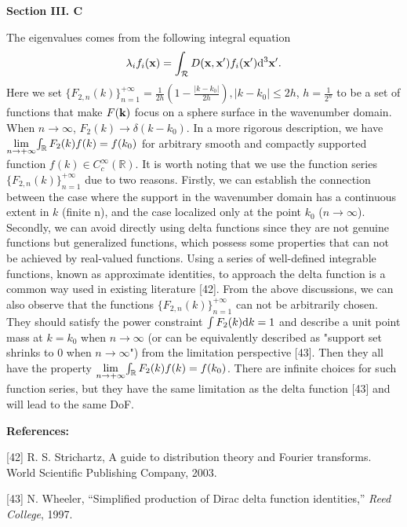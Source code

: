 \documentclass[a4paper,12pt]{article}
\begin{document}
\begin{framed}
	{\bf Section III. C}
	
	\setcounter{equation}{36}

The eigenvalues comes from the following integral equation
\begin{equation}
	\lambda_i f_i({\bf x}) = \int_{\mathcal{R}}D({\bf x},{\bf x}')f_i({\bf x}'){\rm d}^3{\bf x}'.
	\label{eigenfunction_3d}
\end{equation}
Here we set $\{F_{2,n}(k)\}_{n=1}^{+\infty} = \frac{1}{2h}\left( 1-\frac{|k-k_0|}{2h} \right), |k-k_0|\leqslant 2h$, $h = \frac{1}{2^n}$ to be a set of functions that make $F({\bf k})$ focus on a sphere surface in the wavenumber domain. When $n \rightarrow \infty$, $F_2(k) \rightarrow \delta(k-k_0)$. {\color{red} In a more rigorous description, we have $\underset{n \rightarrow +\infty}{\rm lim}{\int_{\mathbb{R}} F_2(k)f(k) } = f(k_0)$ for arbitrary smooth and compactly supported function $f(k) \in C_c^{\infty}({\mathbb R})$. It is worth noting that we use the function series $\{F_{2,n}(k)\}_{n=1}^{+\infty}$ due to two reasons. Firstly, we can establish the connection between the case where the support in the wavenumber domain has a continuous extent in $k$ (finite n), and the case localized only at the point $k_0$ ($n \rightarrow \infty$). Secondly, we can avoid directly using delta functions since they are not genuine functions but generalized functions, which possess some properties that can not be achieved by real-valued functions. Using a series of well-defined integrable functions, known as approximate identities, to approach the delta function is a common way used in existing literature [42]. From the above discussions, we can also observe that the functions $\{F_{2,n}(k)\}_{n=1}^{+\infty}$ can not be arbitrarily chosen. They should satisfy the power constraint $\int F_2(k) {\rm d}k = 1$ and describe a unit point mass at $k = k_0$ when $n \rightarrow \infty$ (or can be equivalently described as "support set shrinks to 0 when $n \rightarrow \infty$")
	from the limitation perspective
	[43]. 
	Then they all have the property $\underset{n \rightarrow +\infty}{\rm lim}{\int_{\mathbb{R}} F_2(k)f(k) } = f(k_0)$. There are infinite choices for such function series, but they have the same limitation as the delta function [43] and will lead to the same DoF.} 
\end{framed}
 
 {\color{blue}
 	{\bf References:}
 	
 	[42] R. S. Strichartz, A guide to distribution theory and Fourier transforms. World Scientific Publishing Company, 2003.
 	
 	[43] N. Wheeler, “Simplified production of Dirac delta function identities,” {\it Reed College}, 1997.
 }
 
\end{document}
